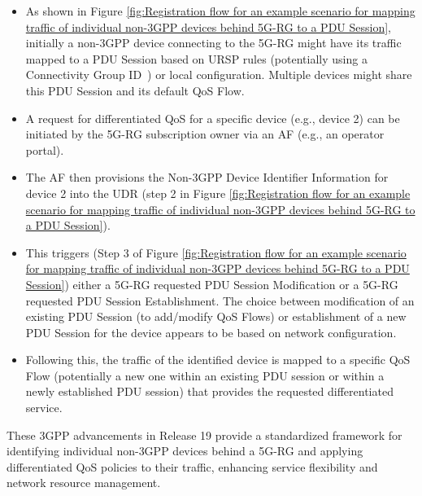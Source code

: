 \begin{enumerate}
{        \begin{itemize}
            \item As shown in Figure \ref{fig:Registration flow for an example scenario for mapping traffic of individual non-3GPP devices behind 5G-RG to a PDU Session}, initially a non-\ac{3GPP} device connecting to the \ac{5G-RG} might have its traffic mapped to a \ac{PDU} Session based on \ac{URSP} rules (potentially using a Connectivity Group ID~\cite{23.316-p27}) or local configuration. Multiple devices might share this \ac{PDU} Session and its default \ac{QoS} Flow.
            \item A request for differentiated \ac{QoS} for a specific device (e.g., device 2) can be initiated by the \ac{5G-RG} subscription owner via an \ac{AF} (e.g., an operator portal).
            \item The \ac{AF} then provisions the Non-\ac{3GPP} Device Identifier Information for device 2 into the \ac{UDR} (step 2 in Figure \ref{fig:Registration flow for an example scenario for mapping traffic of individual non-3GPP devices behind 5G-RG to a PDU Session}).
            \item This triggers (Step 3 of Figure \ref{fig:Registration flow for an example scenario for mapping traffic of individual non-3GPP devices behind 5G-RG to a PDU Session}) either a \ac{5G-RG} requested \ac{PDU} Session Modification or a \ac{5G-RG} requested \ac{PDU} Session Establishment. The choice between modification of an existing \ac{PDU} Session (to add/modify \ac{QoS} Flows) or establishment of a new \ac{PDU} Session for the device appears to be based on network configuration.
            \item Following this, the traffic of the identified device is mapped to a specific \ac{QoS} Flow (potentially a new one within an existing \ac{PDU} session or within a newly established \ac{PDU} session) that provides the requested differentiated service.
        \end{itemize}
    }
\end{enumerate}

These \ac{3GPP} advancements in Release 19 provide a standardized framework for identifying individual non-\ac{3GPP} devices behind a \ac{5G-RG} and applying differentiated \ac{QoS} policies to their traffic, enhancing service flexibility and network resource management.